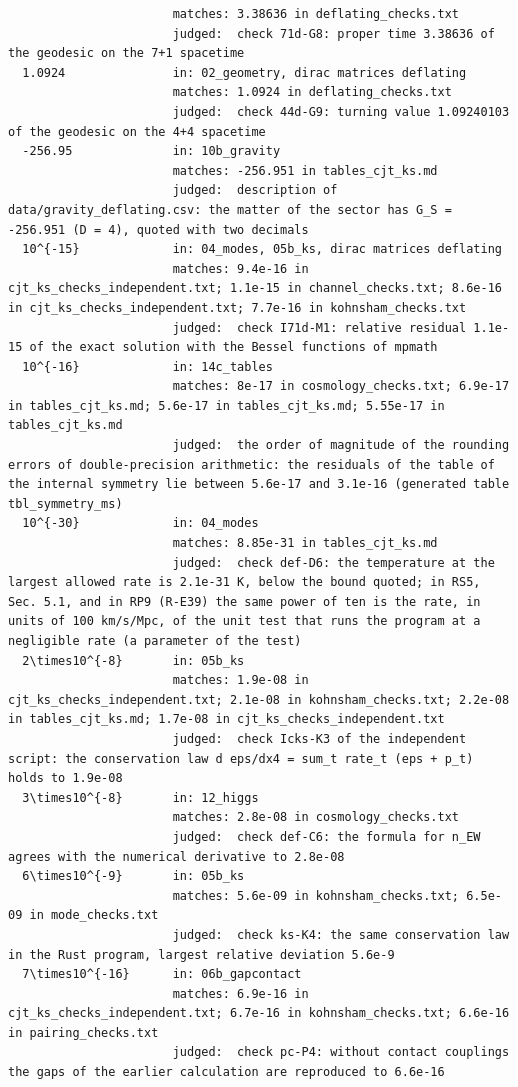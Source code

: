 \documentclass[
  10pt,
]{article}
\begin{document}
\begin{verbatim}
                       matches: 3.38636 in deflating_checks.txt
                       judged:  check 71d-G8: proper time 3.38636 of the geodesic on the 7+1 spacetime
  1.0924               in: 02_geometry, dirac matrices deflating
                       matches: 1.0924 in deflating_checks.txt
                       judged:  check 44d-G9: turning value 1.09240103 of the geodesic on the 4+4 spacetime
  -256.95              in: 10b_gravity
                       matches: -256.951 in tables_cjt_ks.md
                       judged:  description of data/gravity_deflating.csv: the matter of the sector has G_S = -256.951 (D = 4), quoted with two decimals
  10^{-15}             in: 04_modes, 05b_ks, dirac matrices deflating
                       matches: 9.4e-16 in cjt_ks_checks_independent.txt; 1.1e-15 in channel_checks.txt; 8.6e-16 in cjt_ks_checks_independent.txt; 7.7e-16 in kohnsham_checks.txt
                       judged:  check I71d-M1: relative residual 1.1e-15 of the exact solution with the Bessel functions of mpmath
  10^{-16}             in: 14c_tables
                       matches: 8e-17 in cosmology_checks.txt; 6.9e-17 in tables_cjt_ks.md; 5.6e-17 in tables_cjt_ks.md; 5.55e-17 in tables_cjt_ks.md
                       judged:  the order of magnitude of the rounding errors of double-precision arithmetic: the residuals of the table of the internal symmetry lie between 5.6e-17 and 3.1e-16 (generated table tbl_symmetry_ms)
  10^{-30}             in: 04_modes
                       matches: 8.85e-31 in tables_cjt_ks.md
                       judged:  check def-D6: the temperature at the largest allowed rate is 2.1e-31 K, below the bound quoted; in RS5, Sec. 5.1, and in RP9 (R-E39) the same power of ten is the rate, in units of 100 km/s/Mpc, of the unit test that runs the program at a negligible rate (a parameter of the test)
  2\times10^{-8}       in: 05b_ks
                       matches: 1.9e-08 in cjt_ks_checks_independent.txt; 2.1e-08 in kohnsham_checks.txt; 2.2e-08 in tables_cjt_ks.md; 1.7e-08 in cjt_ks_checks_independent.txt
                       judged:  check Icks-K3 of the independent script: the conservation law d eps/dx4 = sum_t rate_t (eps + p_t) holds to 1.9e-08
  3\times10^{-8}       in: 12_higgs
                       matches: 2.8e-08 in cosmology_checks.txt
                       judged:  check def-C6: the formula for n_EW agrees with the numerical derivative to 2.8e-08
  6\times10^{-9}       in: 05b_ks
                       matches: 5.6e-09 in kohnsham_checks.txt; 6.5e-09 in mode_checks.txt
                       judged:  check ks-K4: the same conservation law in the Rust program, largest relative deviation 5.6e-9
  7\times10^{-16}      in: 06b_gapcontact
                       matches: 6.9e-16 in cjt_ks_checks_independent.txt; 6.7e-16 in kohnsham_checks.txt; 6.6e-16 in pairing_checks.txt
                       judged:  check pc-P4: without contact couplings the gaps of the earlier calculation are reproduced to 6.6e-16


\end{verbatim}
\end{document}
